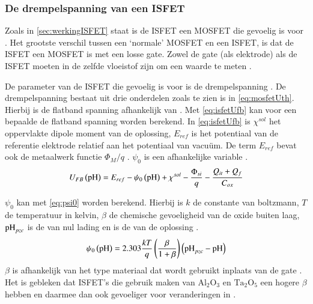 \subsubsection{De drempelspanning van een ISFET}
Zoals in \cref{sec:werkingISFET} staat is de ISFET een MOSFET die gevoelig is voor \si{\pH} \cite{modeling,isfetAsAnElectronicDevice,bergveld1985impactOfMosfetBasedSensors,bergveld2003thirtyYearsISFET}. Het grootste verschil tussen een `normale' MOSFET en een ISFET, is dat de ISFET een MOSFET is met een losse gate. Zowel de gate (als elektrode) als de ISFET moeten in de zelfde vloeistof zijn om een \si{\pH} waarde te meten \cite{modeling,isfetAsAnElectronicDevice,bergveld1985impactOfMosfetBasedSensors,bergveld2003thirtyYearsISFET}.

De parameter van de ISFET die gevoelig is voor \si{\pH} is de drempelspanning \cite{isfetAsAnElectronicDevice,bergveld2003thirtyYearsISFET,bergveld1985impactOfMosfetBasedSensors}. De drempelspanning bestaat uit drie onderdelen zoals te zien is in \cref{eq:mosfetUth}. Hierbij is de flatband spanning afhankelijk van \si{\pH} \cite{isfetAsAnElectronicDevice,bergveld1985impactOfMosfetBasedSensors,bergveld2003thirtyYearsISFET}. Met \cref{eq:isfetUfb} kan voor een bepaalde \si{\pH} de flatband spanning worden berekend. In \cref{eq:isfetUfb} is $\chi^{sol}$ het oppervlakte dipole moment van de oplossing, $E_{ref}$ is het potentiaal van de referentie elektrode relatief aan het potentiaal van vacuüm. De term $E_{ref}$ bevat ook de metaalwerk functie $\Phi_M/q$ \cite{isfetAsAnElectronicDevice,bergveld2003thirtyYearsISFET,bergveld1985impactOfMosfetBasedSensors}. $\psi_0$ is een \si{\pH} afhankelijke variable \cite{isfetAsAnElectronicDevice,bergveld1985impactOfMosfetBasedSensors,bergveld2003thirtyYearsISFET}.
\begin{equation}\label{eq:isfetUfb}
    U_{FB}\left(\ph\right)=E_{ref}-\psi_0\left(\ph\right)+\chi^{sol}-\frac{\Phi_{si}}{q}-\frac{Q_{it}+Q_f}{C_{ox}}
    \tagaddtext{[\si{\volt}]}
\end{equation}

$\psi_0$ kan met \cref{eq:psi0} worden berekend. Hierbij is $k$ de constante van boltzmann, $T$ de temperatuur in kelvin, $\beta$ de chemische gevoeligheid van de oxide buiten laag, $\si{\pH}_{pzc}$ is de \si{\pH} van nul lading en \si{\pH} is de \si{\pH} van de oplossing \cite{bergveld2003thirtyYearsISFET,bergveld1985impactOfMosfetBasedSensors}.
\begin{equation}\label{eq:psi0}
    \psi_0\left(\ph\right)=2.303\frac{kT}{q}\left(\frac{\beta}{1+\beta}\right)\left(\ph_{pzc}-\ph\right)
    \tagaddtext{[\si{\volt}]}
\end{equation}
$\beta$ is afhankelijk van het type materiaal dat wordt gebruikt inplaats van de gate \cite{bergveld2003thirtyYearsISFET,bergveld1985impactOfMosfetBasedSensors}. Het is gebleken dat ISFET's die gebruik maken van $\mathrm{Al_{2}O_3}$ en $\mathrm{Ta_2O_5}$ een hogere $\beta$ hebben en daarmee dan ook gevoeliger voor veranderingen in \si{\pH} \cite{bergveld2003thirtyYearsISFET,bergveld1985impactOfMosfetBasedSensors}.

